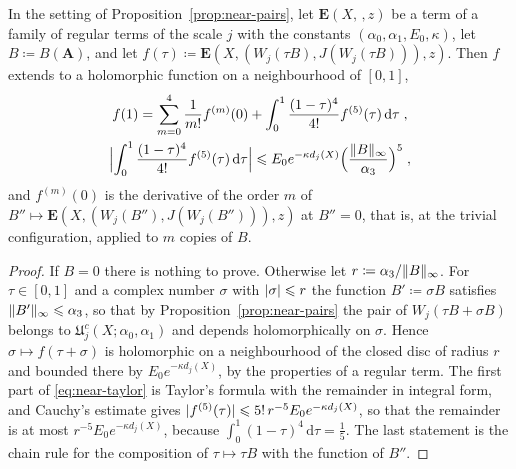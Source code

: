 \documentclass[11pt]{preprint}
\makeatletter
\newcommand{\dd}{\mathrm{d}}
\DeclarePairedDelimiter{\abs}{\lvert}{\rvert}
\DeclarePairedDelimiter{\norm}{\lVert}{\rVert}
\newcommand*{\bigcdot}{}%
\DeclareRobustCommand*{\bigcdot}{%
	\mathbin{\mathpalette\bigcdot@{}}%
}
\newcommand*{\bigcdot@scalefactor}{.7}
\newcommand*{\bigcdot@widthfactor}{1.15}
\newcommand*{\bigcdot@}[2]{%
	\sbox0{$#1\vcenter{}$}%
	\sbox2{$#1\cdot\m@th$}%
	\hbox to \bigcdot@widthfactor\wd2{%
		\hss
		\raise\ht0\hbox{%
			\scalebox{\bigcdot@scalefactor}{%
				\lower\ht0\hbox{$#1\bullet\m@th$}%
			}%
		}%
		\hss
	}%
}
\numberwithin{equation}{section}
\makeatother
\begin{document}
\begin{proposition}\label{prop:near-remainder}
In the setting of Proposition~\ref{prop:near-pairs}, let $\mathbf E(X, \bigcdot\,, z)$ be a term of a family of regular terms of the scale $j$ with the constants $(\alpha_0, \alpha_1, E_0, \kappa)$, let $B \coloneqq B(\mathbf A)$, and let $f(\tau) \coloneqq \mathbf E(X, (W_j(\tau B), J(W_j(\tau B))), z)$. Then $f$ extends to a holomorphic function on a neighbourhood of $[0, 1]$,
\begin{equation}\label{eq:near-taylor}
\begin{gathered}
    f(1) = \sum_{m=0}^{4}\frac{1}{m!}f^{(m)}(0) + \int_0^1\frac{(1 - \tau)^4}{4!}f^{(5)}(\tau)\,\dd\tau\;,\\
    \Bigl\lvert\int_0^1\frac{(1 - \tau)^4}{4!}f^{(5)}(\tau)\,\dd\tau\Bigr\rvert \leqslant E_0e^{-\kappa d_j(X)}\Bigl(\frac{\norm B_\infty}{\alpha_3}\Bigr)^5\;,
\end{gathered}
\end{equation}
and $f^{(m)}(0)$ is the derivative of the order $m$ of $B'' \mapsto \mathbf E(X, (W_j(B''), J(W_j(B''))), z)$ at $B'' = 0$, that is, at the trivial configuration, applied to $m$ copies of $B$.
\end{proposition}

\begin{proof}
If $B = 0$ there is nothing to prove. Otherwise let $r \coloneqq \alpha_3/\norm B_\infty$. For $\tau \in [0, 1]$ and a complex number $\sigma$ with $\abs\sigma \leqslant r$ the function $B' \coloneqq \sigma B$ satisfies $\norm{B'}_\infty \leqslant \alpha_3$, so that by Proposition~\ref{prop:near-pairs} the pair of $W_j(\tau B + \sigma B)$ belongs to $\mathfrak U^c_j(X; \alpha_0, \alpha_1)$ and depends holomorphically on $\sigma$. Hence $\sigma \mapsto f(\tau + \sigma)$ is holomorphic on a neighbourhood of the closed disc of radius $r$ and bounded there by $E_0e^{-\kappa d_j(X)}$, by the properties of a regular term. The first part of \eqref{eq:near-taylor} is Taylor's formula with the remainder in integral form, and Cauchy's estimate gives $\abs{f^{(5)}(\tau)} \leqslant 5!\,r^{-5}E_0e^{-\kappa d_j(X)}$, so that the remainder is at most $r^{-5}E_0e^{-\kappa d_j(X)}$, because $\int_0^1(1 - \tau)^4\,\dd\tau = \frac{1}{5}$. The last statement is the chain rule for the composition of $\tau \mapsto \tau B$ with the function of $B''$.
\end{proof}
\end{document}
